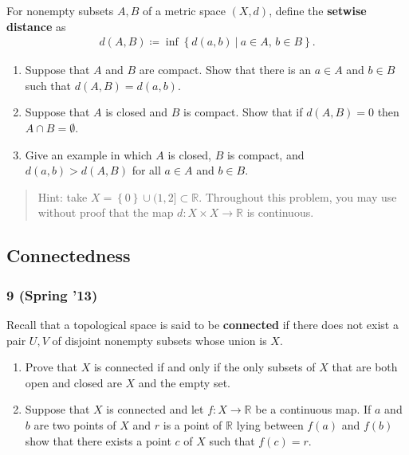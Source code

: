 \begin{problem}[Spring 2021, 3]

For nonempty subsets \(A, B\) of a metric space \((X, d)\), define the
\textbf{setwise distance} as
\begin{align*}
d(A, B) \coloneqq\inf \left\{{ d(a, b) {~\mathrel{\Big\vert}~}a\in A,\, b\in B }\right\} 
.\end{align*}

\begin{enumerate}
\def\labelenumi{\alph{enumi}.}
\item
  Suppose that \(A\) and \(B\) are compact. Show that there is an
  \(a\in A\) and \(b\in B\) such that \(d(A, B) = d(a, b)\).
\item
  Suppose that \(A\) is closed and \(B\) is compact. Show that if
  \(d(A, B) = 0\) then \(A \cap B = \emptyset\).
\item
  Give an example in which \(A\) is closed, \(B\) is compact, and
  \(d(a, b) > d(A, B)\) for all \(a\in A\) and \(b\in B\).
\end{enumerate}

\begin{quote}
Hint: take \(X = \left\{{ 0 }\right\} \cup(1, 2] \subset {\mathbb{R}}\).
Throughout this problem, you may use without proof that the map
\(d:X\times X\to {\mathbb{R}}\) is continuous.
\end{quote}

\end{problem}

\hypertarget{connectedness}{%
\subsection{Connectedness}\label{connectedness}}

\hypertarget{spring-13}{%
\subsubsection{9 (Spring '13)}\label{spring-13}}

\begin{problem}[?]

Recall that a topological space is said to be \textbf{connected} if
there does not exist a pair \(U, V\) of disjoint nonempty subsets whose
union is \(X\).

\begin{enumerate}
\def\labelenumi{\alph{enumi}.}
\item
  Prove that \(X\) is connected if and only if the only subsets of \(X\)
  that are both open and closed are \(X\) and the empty set.
\item
  Suppose that \(X\) is connected and let \(f : X \to {\mathbb{R}}\) be
  a continuous map. If \(a\) and \(b\) are two points of \(X\) and \(r\)
  is a point of \({\mathbb{R}}\) lying between \(f (a)\) and \(f (b)\)
  show that there exists a point \(c\) of \(X\) such that \(f (c) = r\).
\end{enumerate}

\end{problem}

